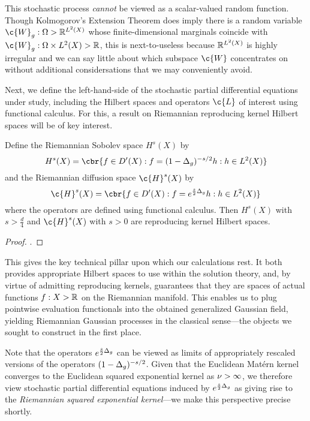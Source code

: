 \documentclass[11pt]{book}
\begin{document}
This stochastic process \emph{cannot} be viewed as a scalar-valued random function.
Though Kolmogorov's Extension Theorem does imply there is a random variable $\c{W}_g : \Omega \-> \R^{L^2(X)}$ whose finite-dimensional marginals coincide with $\c{W}_g : \Omega \x L^2(X) \-> \R$, this is next-to-useless because $\mathbb{R}^{L^2(X)}$ is highly irregular and we can say little about which subspace $\c{W}$ concentrates on without additional considersations that we may conveniently avoid.

Next, we define the left-hand-side of the stochastic partial differential equations under study, including the Hilbert spaces and operators $\c{L}$ of interest using functional calculus.
For this, a result on Riemannian reproducing kernel Hilbert spaces will be of key interest.

\begin{result}
\label{res:riemannian-sobolev}
Define the Riemannian Sobolev space $H^s(X)$ by
\[
H^s(X) = \cbr{f \in D'(X) : f = (1 - \lap_g)^{-s/2} h : h \in L^2(X)}
\]
and the Riemannian diffusion space $\c{H}^s(X)$ by
\[
\c{H}^s(X) = \cbr{f \in D'(X) : f = e^{\frac{s}{2}\lap_g} h : h \in L^2(X)}
\]
where the operators are defined using functional calculus.
Then $H^s(X)$ with $s > \frac{d}{4}$ and $\c{H}^s(X)$ with $s > 0$ are reproducing kernel Hilbert spaces.
\end{result}

\begin{proof}
\textcite[Theorem 3 and Theorem 6]{devito20}.
\end{proof}

This gives the key technical pillar upon which our calculations rest.
It both provides appropriate Hilbert spaces to use within the solution theory, and, by virtue of admitting reproducing kernels, guarantees that they are spaces of actual functions $f : X \-> \mathbb{R}$ on the Riemannian manifold.
This enables us to plug pointwise evaluation functionals into the obtained generalized Gaussian field, yielding Riemannian Gaussian processes in the classical sense---the objects we sought to construct in the first place.

Note that the operators $e^{\frac{s}{2}\Delta_g}$ can be viewed as limits of appropriately rescaled versions of the operators $(1 - \Delta_g)^{-s/2}$. 
Given that the Euclidean Matérn kernel converges to the Euclidean squared exponential kernel as $\nu\->\infty$, we therefore view stochastic partial differential equations induced by $e^{\frac{s}{2}\Delta_g}$ as giving rise to the \emph{Riemannian squared exponential kernel}---we make this perspective precise shortly.
\end{document}
